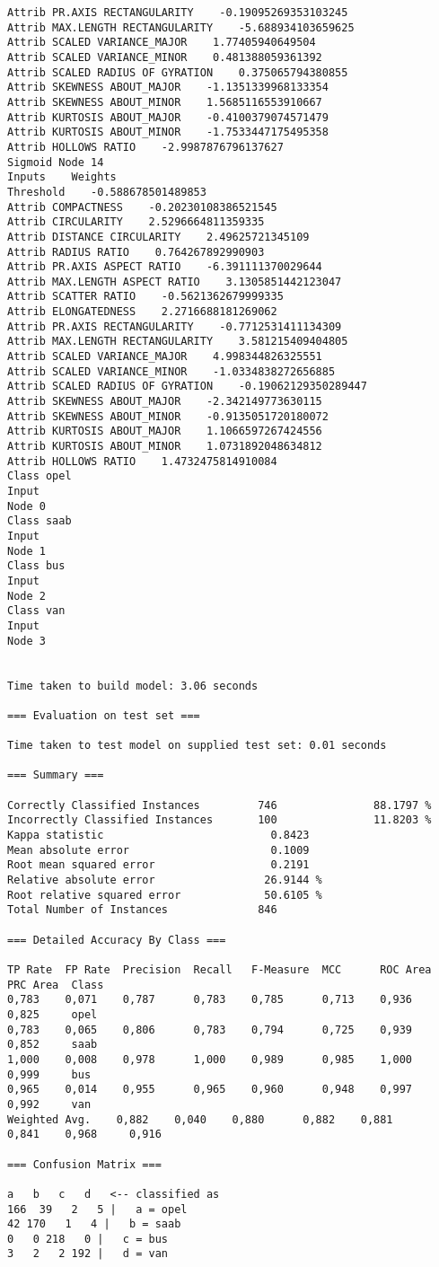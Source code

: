 \documentclass[
	article,			%
	11pt,				%
	oneside,			%
	a4paper,			%
	english,			%
	brazil,				%
	sumario=tradicional
	]{abntex2}
\begin{document}
\begin{lstlisting}
Attrib PR.AXIS RECTANGULARITY    -0.19095269353103245
Attrib MAX.LENGTH RECTANGULARITY    -5.688934103659625
Attrib SCALED VARIANCE_MAJOR    1.77405940649504
Attrib SCALED VARIANCE_MINOR    0.481388059361392
Attrib SCALED RADIUS OF GYRATION    0.375065794380855
Attrib SKEWNESS ABOUT_MAJOR    -1.1351339968133354
Attrib SKEWNESS ABOUT_MINOR    1.5685116553910667
Attrib KURTOSIS ABOUT_MAJOR    -0.4100379074571479
Attrib KURTOSIS ABOUT_MINOR    -1.7533447175495358
Attrib HOLLOWS RATIO    -2.9987876796137627
Sigmoid Node 14
Inputs    Weights
Threshold    -0.588678501489853
Attrib COMPACTNESS    -0.20230108386521545
Attrib CIRCULARITY    2.5296664811359335
Attrib DISTANCE CIRCULARITY    2.49625721345109
Attrib RADIUS RATIO    0.764267892990903
Attrib PR.AXIS ASPECT RATIO    -6.391111370029644
Attrib MAX.LENGTH ASPECT RATIO    3.1305851442123047
Attrib SCATTER RATIO    -0.5621362679999335
Attrib ELONGATEDNESS    2.2716688181269062
Attrib PR.AXIS RECTANGULARITY    -0.7712531411134309
Attrib MAX.LENGTH RECTANGULARITY    3.581215409404805
Attrib SCALED VARIANCE_MAJOR    4.998344826325551
Attrib SCALED VARIANCE_MINOR    -1.0334838272656885
Attrib SCALED RADIUS OF GYRATION    -0.19062129350289447
Attrib SKEWNESS ABOUT_MAJOR    -2.342149773630115
Attrib SKEWNESS ABOUT_MINOR    -0.9135051720180072
Attrib KURTOSIS ABOUT_MAJOR    1.1066597267424556
Attrib KURTOSIS ABOUT_MINOR    1.0731892048634812
Attrib HOLLOWS RATIO    1.4732475814910084
Class opel
Input
Node 0
Class saab
Input
Node 1
Class bus
Input
Node 2
Class van
Input
Node 3


Time taken to build model: 3.06 seconds

=== Evaluation on test set ===

Time taken to test model on supplied test set: 0.01 seconds

=== Summary ===

Correctly Classified Instances         746               88.1797 %
Incorrectly Classified Instances       100               11.8203 %
Kappa statistic                          0.8423
Mean absolute error                      0.1009
Root mean squared error                  0.2191
Relative absolute error                 26.9144 %
Root relative squared error             50.6105 %
Total Number of Instances              846     

=== Detailed Accuracy By Class ===

TP Rate  FP Rate  Precision  Recall   F-Measure  MCC      ROC Area  PRC Area  Class
0,783    0,071    0,787      0,783    0,785      0,713    0,936     0,825     opel
0,783    0,065    0,806      0,783    0,794      0,725    0,939     0,852     saab
1,000    0,008    0,978      1,000    0,989      0,985    1,000     0,999     bus
0,965    0,014    0,955      0,965    0,960      0,948    0,997     0,992     van
Weighted Avg.    0,882    0,040    0,880      0,882    0,881      0,841    0,968     0,916     

=== Confusion Matrix ===

a   b   c   d   <-- classified as
166  39   2   5 |   a = opel
42 170   1   4 |   b = saab
0   0 218   0 |   c = bus
3   2   2 192 |   d = van


\end{lstlisting}
\end{document}
